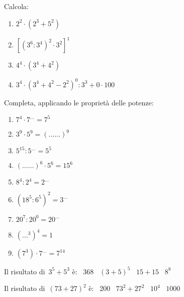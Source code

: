 \newpage %

\begin{esercizio}
Calcola:
 \begin{multicols}{2}
 \begin{enumerate}[noitemsep, label=(\alph*)]
 \item \(2^2\cdot(2^3+5^2)\)
 \item \([(3^6:3^4)^2\cdot3^2]^1\)
 \item \(4^4\cdot(3^4+4^2)\)
 \item \(3^4\cdot(3^4+4^2-2^2)^0:3^3+0\cdot100\)
 \end{enumerate}
 \end{multicols}
\end{esercizio}

\begin{esercizio}
 Completa, applicando le proprietà delle potenze:
\begin{multicols}{3}
 \begin{enumerate}[noitemsep, label=(\alph*)]
 \item \(7^4\cdot7^{\ldots}=7^5\)
 \item \(3^9\cdot5^9=(\ldots\ldots)^9\)
 \item \(5^{15}:5^{\ldots}=5^5\)
 \item \((\ldots\ldots)^6\cdot5^6=15^6\)
 \item \(8^4:2^4=2^{\ldots}\)
 \item \((18^5:6^5)^2=3^{\ldots}\)
 \item \(20^7:20^0=20^{\ldots}\)
 \item \((\ldots^3)^4=1\)
 \item \((7^3) \cdot 7^{\dots}=7^{14}\)
 \end{enumerate}
\end{multicols}
\end{esercizio}

\begin{esercizio}
 Il risultato di~\(3^5+5^3\) è: \quad \quad \quad \quad
 \boxA\enspace~368 \quad \boxB\enspace~\((3+5)^5\) \quad 
\boxC\enspace~\(15+15\) \quad \boxD\enspace~\(8^8\)
 \end{esercizio}

\begin{esercizio}
 Il risultato di~\((73+27)^2\) è: \quad \quad
 \boxA\enspace~200 \quad\boxB\enspace~\(73^2+27^2\) 
\quad\boxC\enspace~\(10^4\) \quad\boxD\enspace~\(1000\)
\end{esercizio}

